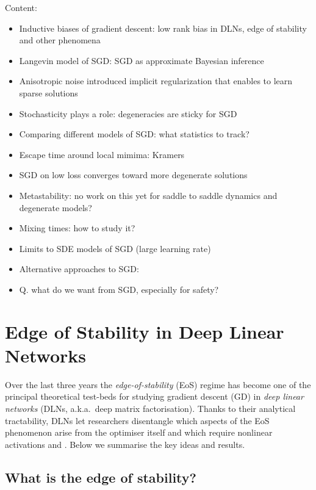 \documentclass[11pt]{article}
\begin{document}
Content:
\begin{itemize}
    \item Inductive biases of gradient descent: low rank bias in DLNs, edge of stability and other phenomena 
    \item Langevin model of SGD: SGD as approximate Bayesian inference
    \item Anisotropic noise introduced implicit regularization that enables to learn sparse solutions
    \item Stochasticity plays a role: degeneracies are sticky for SGD
    \item Comparing different models of SGD: what statistics to track?
    \item Escape time around local mimima: Kramers
    \item SGD on low loss converges toward more degenerate solutions
    \item Metastability: no work on this yet for saddle to saddle dynamics and degenerate models?
    \item Mixing times: how to study it?
    \item Limits to SDE models of SGD (large learning rate)
    \item Alternative approaches to SGD: 
    \item Q. what do we want from SGD, especially for safety?
\end{itemize}

\section{Edge of Stability in Deep Linear Networks}
\label{sec:eos-dln}

Over the last three years the \emph{edge-of-stability} (EoS) regime has
become one of the principal theoretical test-beds for studying gradient
descent (GD) in \emph{deep linear networks} (DLNs, a.k.a.\ deep matrix
factorisation).  Thanks to their analytical tractability, DLNs let
researchers disentangle which aspects of the EoS phenomenon arise from
the optimiser itself and which require nonlinear activations
\citep{Arora2022Understanding} and \citep{Li2022SharpnessEoS}.  Below we summarise
the key ideas and results.

\subsection{What is the edge of stability?}
\end{document}
